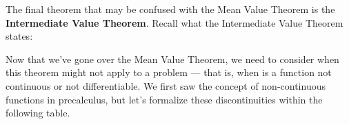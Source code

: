 \begin{center}
\end{center}

The final theorem that may be confused with the Mean Value Theorem is the \textbf{Intermediate Value Theorem}. Recall what the Intermediate Value Theorem states: \par

\begin{center}
\end{center}

Now that we've gone over the Mean Value Theorem, we need to consider when this theorem might not apply to a problem --- that is, when is a function not continuous or not differentiable. We first saw the concept of non-continuous functions in precalculus, but let's formalize these discontinuities within the following table. \par

